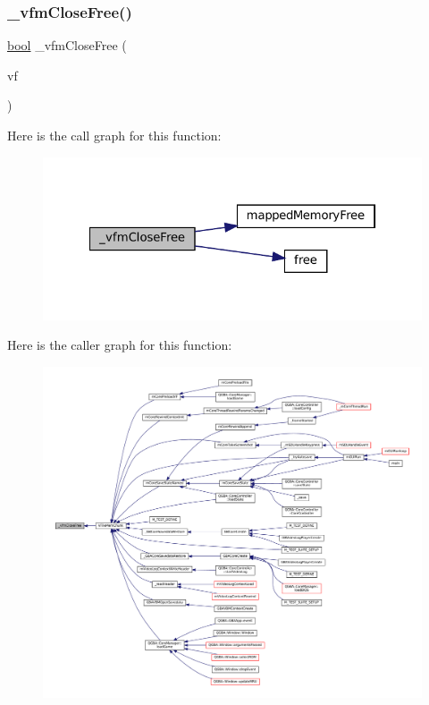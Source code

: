 \subsubsection{\texorpdfstring{\+\_\+vfm\+Close\+Free()}{\_vfmCloseFree()}}
{\footnotesize\ttfamily \mbox{\hyperlink{libretro_8h_a4a26dcae73fb7e1528214a068aca317e}{bool}} \+\_\+vfm\+Close\+Free (\begin{DoxyParamCaption}\item[{struct V\+File $\ast$}]{vf }\end{DoxyParamCaption})\hspace{0.3cm}{\ttfamily [static]}}

Here is the call graph for this function\+:
\nopagebreak
\begin{figure}[H]
\begin{center}
\leavevmode
\includegraphics[width=322pt]{vfs-mem_8c_a069232afe676b38b6fc35d195b890a78_cgraph}
\end{center}
\end{figure}
Here is the caller graph for this function\+:
\nopagebreak
\begin{figure}[H]
\begin{center}
\leavevmode
\includegraphics[width=350pt]{vfs-mem_8c_a069232afe676b38b6fc35d195b890a78_icgraph}
\end{center}
\end{figure}
\mbox{\label{vfs-mem_8c_afb9f6199d8108a580de61d7ddc4a1b9b}} 

